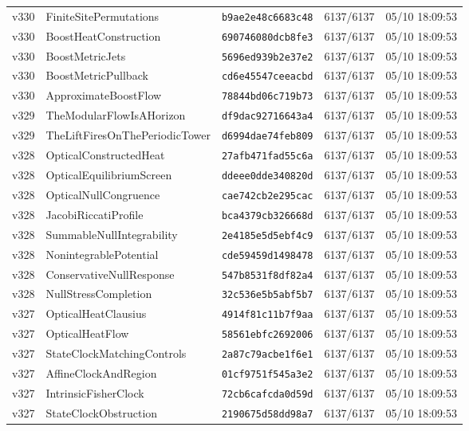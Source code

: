 \documentclass[11pt]{article}
\theoremstyle{definition}\newtheorem{deriv}{Derivation}
\begin{document}
{\begin{longtable}{@{}lllll@{}}
v330 & FiniteSitePermutations & \texttt{b9ae2e48c6683c48} & 6137/6137 & 05/10 18:09:53 \\
v330 & BoostHeatConstruction & \texttt{690746080dcb8fe3} & 6137/6137 & 05/10 18:09:53 \\
v330 & BoostMetricJets & \texttt{5696ed939b2e37e2} & 6137/6137 & 05/10 18:09:53 \\
v330 & BoostMetricPullback & \texttt{cd6e45547ceeacbd} & 6137/6137 & 05/10 18:09:53 \\
v330 & ApproximateBoostFlow & \texttt{78844bd06c719b73} & 6137/6137 & 05/10 18:09:53 \\
v329 & TheModularFlowIsAHorizon & \texttt{df9dac92716643a4} & 6137/6137 & 05/10 18:09:53 \\
v329 & TheLiftFiresOnThePeriodicTower & \texttt{d6994dae74feb809} & 6137/6137 & 05/10 18:09:53 \\
v328 & OpticalConstructedHeat & \texttt{27afb471fad55c6a} & 6137/6137 & 05/10 18:09:53 \\
v328 & OpticalEquilibriumScreen & \texttt{ddeee0dde340820d} & 6137/6137 & 05/10 18:09:53 \\
v328 & OpticalNullCongruence & \texttt{cae742cb2e295cac} & 6137/6137 & 05/10 18:09:53 \\
v328 & JacobiRiccatiProfile & \texttt{bca4379cb326668d} & 6137/6137 & 05/10 18:09:53 \\
v328 & SummableNullIntegrability & \texttt{2e4185e5d5ebf4c9} & 6137/6137 & 05/10 18:09:53 \\
v328 & NonintegrablePotential & \texttt{cde59459d1498478} & 6137/6137 & 05/10 18:09:53 \\
v328 & ConservativeNullResponse & \texttt{547b8531f8df82a4} & 6137/6137 & 05/10 18:09:53 \\
v328 & NullStressCompletion & \texttt{32c536e5b5abf5b7} & 6137/6137 & 05/10 18:09:53 \\
v327 & OpticalHeatClausius & \texttt{4914f81c11b7f9aa} & 6137/6137 & 05/10 18:09:53 \\
v327 & OpticalHeatFlow & \texttt{58561ebfc2692006} & 6137/6137 & 05/10 18:09:53 \\
v327 & StateClockMatchingControls & \texttt{2a87c79acbe1f6e1} & 6137/6137 & 05/10 18:09:53 \\
v327 & AffineClockAndRegion & \texttt{01cf9751f545a3e2} & 6137/6137 & 05/10 18:09:53 \\
v327 & IntrinsicFisherClock & \texttt{72cb6cafcda0d59d} & 6137/6137 & 05/10 18:09:53 \\
v327 & StateClockObstruction & \texttt{2190675d58dd98a7} & 6137/6137 & 05/10 18:09:53 \\

\end{longtable}}
\end{document}
